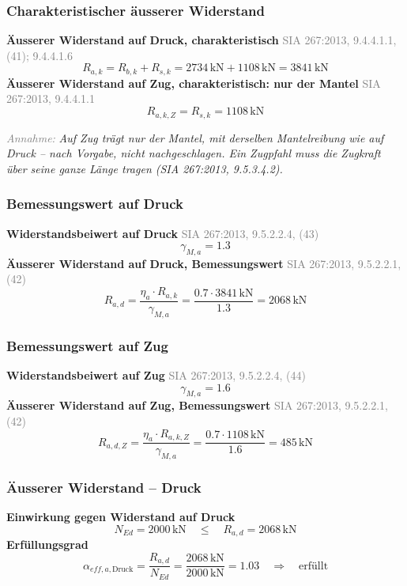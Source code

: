 \documentclass[11pt,a4paper]{article}
\newcommand{\normref}[1]{{\small\textcolor{gray}{#1}}}
\newcommand{\hinweis}[2]{\par\noindent\textcolor{gray}{\textit{#1:}} \textit{#2}\par}
\begin{document}
\subsubsection{Charakteristischer äusserer Widerstand}
\noindent\textbf{Äusserer Widerstand auf Druck, charakteristisch} \hfill \normref{SIA 267:2013, 9.4.4.1.1, (41); 9.4.4.1.6}
\begin{equation*}
R_{a,k} = R_{b,k} + R_{s,k} = 2734\,\mathrm{kN} + 1108\,\mathrm{kN} = 3841\,\mathrm{kN}
\end{equation*}
\noindent\textbf{Äusserer Widerstand auf Zug, charakteristisch: nur der Mantel} \hfill \normref{SIA 267:2013, 9.4.4.1.1}
\begin{equation*}
R_{a,k,Z} = R_{s,k} = 1108\,\mathrm{kN}
\end{equation*}
\hinweis{Annahme}{Auf Zug trägt nur der Mantel, mit derselben Mantelreibung wie auf Druck -- nach Vorgabe, nicht nachgeschlagen. Ein Zugpfahl muss die Zugkraft über seine ganze Länge tragen (SIA 267:2013, 9.5.3.4.2).}
\subsubsection{Bemessungswert auf Druck}
\noindent\textbf{Widerstandsbeiwert auf Druck} \hfill \normref{SIA 267:2013, 9.5.2.2.4, (43)}
\begin{equation*}
\gamma_{M,a} = 1.3
\end{equation*}
\noindent\textbf{Äusserer Widerstand auf Druck, Bemessungswert} \hfill \normref{SIA 267:2013, 9.5.2.2.1, (42)}
\begin{equation*}
R_{a,d} = \frac{\eta_a \cdot R_{a,k}}{\gamma_{M,a}} = \frac{0.7 \cdot 3841\,\mathrm{kN}}{1.3} = 2068\,\mathrm{kN}
\end{equation*}
\subsubsection{Bemessungswert auf Zug}
\noindent\textbf{Widerstandsbeiwert auf Zug} \hfill \normref{SIA 267:2013, 9.5.2.2.4, (44)}
\begin{equation*}
\gamma_{M,a} = 1.6
\end{equation*}
\noindent\textbf{Äusserer Widerstand auf Zug, Bemessungswert} \hfill \normref{SIA 267:2013, 9.5.2.2.1, (42)}
\begin{equation*}
R_{a,d,Z} = \frac{\eta_a \cdot R_{a,k,Z}}{\gamma_{M,a}} = \frac{0.7 \cdot 1108\,\mathrm{kN}}{1.6} = 485\,\mathrm{kN}
\end{equation*}
\subsubsection{Äusserer Widerstand – Druck}
\noindent\textbf{Einwirkung gegen Widerstand auf Druck}
\begin{equation*}
N_{Ed} = 2000\,\mathrm{kN} \quad \le \quad R_{a,d} = 2068\,\mathrm{kN}
\end{equation*}
\noindent\textbf{Erfüllungsgrad}
\begin{equation*}
\alpha_{eff,a,\text{Druck}} = \frac{R_{a,d}}{N_{Ed}} = \frac{2068\,\mathrm{kN}}{2000\,\mathrm{kN}} = 1.03 \quad \Rightarrow \quad \text{erfüllt}
\end{equation*}
\end{document}
